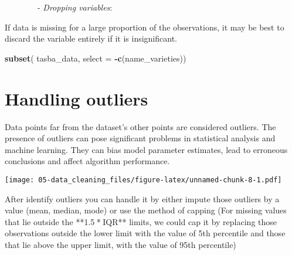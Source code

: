 \documentclass[
]{book}
\newenvironment{Shaded}{\begin{snugshade}}{\end{snugshade}}
\newcommand{\AttributeTok}[1]{\textcolor[rgb]{0.13,0.29,0.53}{#1}}
\newcommand{\FloatTok}[1]{\textcolor[rgb]{0.00,0.00,0.81}{#1}}
\newcommand{\FunctionTok}[1]{\textcolor[rgb]{0.13,0.29,0.53}{\textbf{#1}}}
\newcommand{\NormalTok}[1]{#1}
\newcommand{\OtherTok}[1]{\textcolor[rgb]{0.56,0.35,0.01}{#1}}
\newcommand{\SpecialCharTok}[1]{\textcolor[rgb]{0.81,0.36,0.00}{\textbf{#1}}}
\newcommand{\StringTok}[1]{\textcolor[rgb]{0.31,0.60,0.02}{#1}}
\begin{document}
~~~~~~~~- \emph{Dropping variables}:

If data is missing for a large proportion of the observations, it may be best to discard the variable entirely if it is insignificant.

\begin{Shaded}
\begin{Highlighting}[]
\FunctionTok{subset}\NormalTok{( tasba\_data, }\AttributeTok{select =} \SpecialCharTok{{-}}\FunctionTok{c}\NormalTok{(name\_varieties))}
\end{Highlighting}
\end{Shaded}

\hypertarget{handling-outliers}{%
\section{Handling outliers}\label{handling-outliers}}

Data points far from the dataset's other points are considered outliers. The presence of outliers can pose significant problems in statistical analysis and machine learning. They can bias model parameter estimates, lead to erroneous conclusions and affect algorithm performance.

\begin{Shaded}
\end{Shaded}

\texttt{[image: 05-data\_cleaning\_files/figure-latex/unnamed-chunk-8-1.pdf]}

After identify outliers you can handle it by either impute those outliers by a value (mean, median, mode) or use the method of capping (For missing values that lie outside the **1.5 * IQR** limits, we could cap it by replacing those observations outside the lower limit with the value of 5th percentile and those that lie above the upper limit, with the value of 95th percentile)
\end{document}
